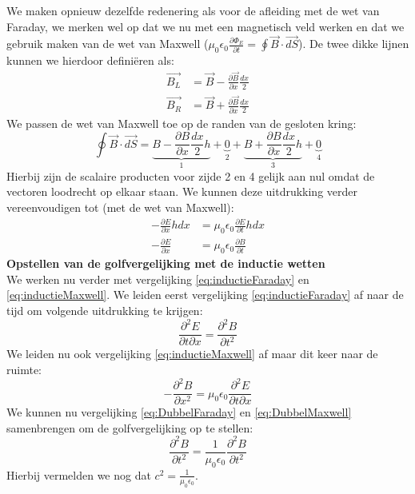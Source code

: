 \documentclass[a4paper,kul]{kulakarticle} %
\begin{document}
We maken opnieuw dezelfde redenering als voor de afleiding met de wet van Faraday, we merken wel op dat we nu met een magnetisch veld werken en dat we gebruik maken van de wet van Maxwell ($\mu_0\epsilon_0\frac{\partial \Phi_E}{\partial t}=\oint\vec{B}\cdot\vec{dS}$). De twee dikke lijnen kunnen we hierdoor definiëren als:
\begin{align*}
	\vec{B_L} &= \vec{B}-\frac{\partial\vec{B}}{\partial x}\frac{dx}{2}\\
	\vec{B_R} &= \vec{B}+\frac{\partial\vec{B}}{\partial x}\frac{dx}{2}	
\end{align*}
We passen de wet van Maxwell toe op de randen van de gesloten kring:
\begin{equation*}
	\oint\vec{B}\cdot\vec{dS} = \underbrace{B-\frac{\partial B}{\partial x}\frac{dx}{2}h}_1 + \underbrace{0}_2 +\underbrace{B+\frac{\partial B}{\partial x}\frac{dx}{2}h}_3 + \underbrace{0}_4
\end{equation*}
Hierbij zijn de scalaire producten voor zijde 2 en 4 gelijk aan nul omdat de vectoren loodrecht op elkaar staan. We kunnen deze uitdrukking verder vereenvoudigen tot (met de wet van Maxwell):
\begin{align}
	-\frac{\partial E}{\partial x}hdx &= \mu_0\epsilon_0\frac{\partial E}{\partial t}hdx\\
	\label{eq:inductieMaxwell}
	-\frac{\partial E}{\partial x} &= \mu_0\epsilon_0\frac{\partial B}{\partial t}
\end{align}
\newpage
\textbf{Opstellen van de golfvergelijking met de inductie wetten}\\
We werken nu verder met vergelijking \ref{eq:inductieFaraday} en \ref{eq:inductieMaxwell}. We leiden eerst vergelijking \ref{eq:inductieFaraday} af naar de tijd om volgende uitdrukking te krijgen:
\begin{equation}
	\label{eq:DubbelFaraday}
	\frac{\partial^2E}{\partial t\partial x} = \frac{\partial^2B}{\partial t^2}
\end{equation}
We leiden nu ook vergelijking \ref{eq:inductieMaxwell} af maar dit keer naar de ruimte:
\begin{equation}
	\label{eq:DubbelMaxwell}
	-\frac{\partial^2B}{\partial x^2} = \mu_0\epsilon_0\frac{\partial^2E}{\partial t\partial x}
\end{equation}
We kunnen nu vergelijking \ref{eq:DubbelFaraday} en \ref{eq:DubbelMaxwell} samenbrengen om de golfvergelijking op te stellen:
\begin{equation*}
	\frac{\partial^2B}{\partial t^2}=\frac{1}{\mu_0\epsilon_0}\frac{\partial^2B}{\partial t^2}
\end{equation*}
Hierbij vermelden we nog dat $c^2=\frac{1}{\mu_0\epsilon_0}$.
\newpage
\end{document}
